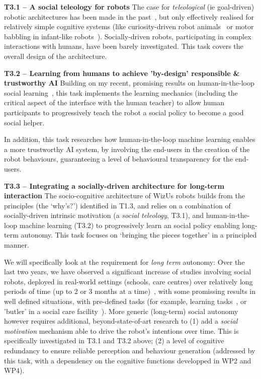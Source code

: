 \documentclass[11pt,a4paper]{report}
\newcommand{\project}{WizUs\xspace}
\begin{document}
\textbf{T3.1 -- A social teleology for robots}
The case for \emph{teleological} (ie goal-driven) robotic architectures has been
made in the past~\cite{wrede2012towards}, but only effectively realised for
relatively simple cognitive systems (like curiosity-driven robot
animals~\cite{oudeyer2005playground} or motor babbling in infant-like
robots~\cite{forestier2017unified}). Socially-driven robots, participating in
complex interactions with humans, have been barely investigated. This task
covers the overall design of the architecture.


\textbf{T3.2 -- Learning from humans to achieve 'by-design' responsible \&
trustworthy AI} Building on my recent, promising results on human-in-the-loop
social learning~\cite{senft2017supervised,senft2019teaching,winkle2020coach}, this task
implements the learning mechanics (including the critical aspect of the
interface with the human teacher) to allow human participants to progressively
teach the robot a social policy to become a good social helper.

In addition, this task researches how human-in-the-loop machine learning enables a more
trustworthy AI system, by involving the end-users in the creation of the robot
behaviours, guaranteeing a level of behavioural transparency for the end-users.

\textbf{T3.3 -- Integrating a socially-driven architecture for long-term interaction} The
socio-cognitive architecture of \project robots builds from the principles (the
`why's?') identified in T1.3, and relies on a combination of socially-driven
intrinsic motivation (a \emph{social teleology}, T3.1), and human-in-the-loop machine
learning (T3.2) to progressively learn an social policy enabling long-term
autonomy. This task focuses on `bringing the pieces together' in a principled
manner.

We will specifically look at the requirement for \emph{long term} autonomy: Over
the last two years, we have observed a significant increase of studies
involving social robots, deployed in real-world settings (schools, care centres)
over relatively long periods of time (up to 2 or 3 months at a
time)~\cite{kunze2018artificial,leite2013social}, with some promissing results
in well defined situations, with pre-defined tasks (for example, learning
tasks~\cite{senft2019teaching}, or 'butler' in a social care
facility~\cite{hawes2017strands}). More generic (long-term) social autonomy
however requires additional, beyond-state-of-art research to (1) add a
\emph{social motivation} mechanism able to drive the robot's intentions over
time. This is specifically investigated in T3.1 and T3.2 above; (2) a level of
cognitive redundancy to ensure reliable perception and behaviour generation
(addressed by this task, with a dependency on the cognitive functions developped
in WP2 and WP4).
\end{document}
